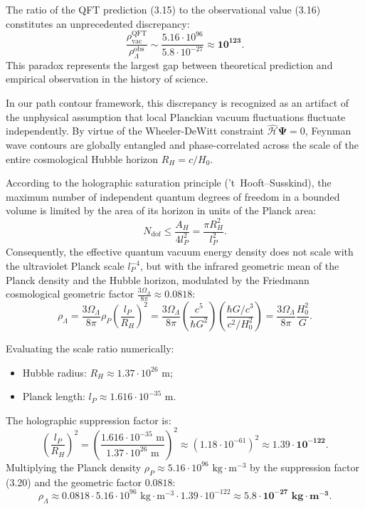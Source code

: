 \documentclass[11pt,a4paper]{article}
\theoremstyle{definition}
\begin{document}
The ratio of the QFT prediction (3.15) to the observational value (3.16) constitutes an unprecedented discrepancy:
\begin{equation}\label{eq:3.17}\tag{3.17}
\frac{\rho_{\text{vac}}^{\text{QFT}}}{\rho_{\Lambda}^{\text{obs}}} \sim \frac{5.16 \cdot 10^{96}}{5.8 \cdot 10^{-27}} \approx \mathbf{10^{123}}.
\end{equation}
This paradox represents the largest gap between theoretical prediction and empirical observation in the history of science.

In our path contour framework, this discrepancy is recognized as an artifact of the unphysical assumption that local Planckian vacuum fluctuations fluctuate independently. By virtue of the Wheeler-DeWitt constraint $\hat{\mathcal{H}}\mathbf{\Psi} = 0$, Feynman wave contours are globally entangled and phase-correlated across the scale of the entire cosmological Hubble horizon $R_H = c/H_0$.

According to the holographic saturation principle ('t~Hooft--Susskind), the maximum number of independent quantum degrees of freedom in a bounded volume is limited by the area of its horizon in units of the Planck area:
\begin{equation}\label{eq:3.18}\tag{3.18}
N_{\text{dof}} \le \frac{A_H}{4 l_P^2} = \frac{\pi R_H^2}{l_P^2}.
\end{equation}
Consequently, the effective quantum vacuum energy density does not scale with the ultraviolet Planck scale $l_P^{-4}$, but with the infrared geometric mean of the Planck density and the Hubble horizon, modulated by the Friedmann cosmological geometric factor $\frac{3\Omega_\Lambda}{8\pi} \approx 0.0818$:
\begin{equation}\label{eq:3.19}\tag{3.19}
\rho_\Lambda = \frac{3\Omega_\Lambda}{8\pi} \rho_P \left( \frac{l_P}{R_H} \right)^2 = \frac{3\Omega_\Lambda}{8\pi} \left( \frac{c^5}{\hbar G^2} \right) \left( \frac{\hbar G / c^3}{c^2 / H_0^2} \right) = \frac{3\Omega_\Lambda}{8\pi} \frac{H_0^2}{G}.
\end{equation}

Evaluating the scale ratio numerically:
\begin{itemize}
\item Hubble radius: $R_H \approx 1.37 \cdot 10^{26}\text{ m}$;
\item Planck length: $l_P \approx 1.616 \cdot 10^{-35}\text{ m}$.
\end{itemize}
The holographic suppression factor is:
\begin{equation}\label{eq:3.20}\tag{3.20}
\left( \frac{l_P}{R_H} \right)^2 = \left( \frac{1.616 \cdot 10^{-35}\text{ m}}{1.37 \cdot 10^{26}\text{ m}} \right)^2 \approx (1.18 \cdot 10^{-61})^2 \approx \mathbf{1.39 \cdot 10^{-122}}.
\end{equation}
Multiplying the Planck density $\rho_P \approx 5.16 \cdot 10^{96}\text{ kg}\cdot\text{m}^{-3}$ by the suppression factor (3.20) and the geometric factor $0.0818$:
\begin{equation}\label{eq:3.21}\tag{3.21}
\rho_\Lambda \approx 0.0818 \cdot 5.16 \cdot 10^{96}\text{ kg}\cdot\text{m}^{-3} \cdot 1.39 \cdot 10^{-122} \approx \mathbf{5.8 \cdot 10^{-27}\text{ kg}\cdot\text{m}^{-3}}.
\end{equation}
\end{document}

